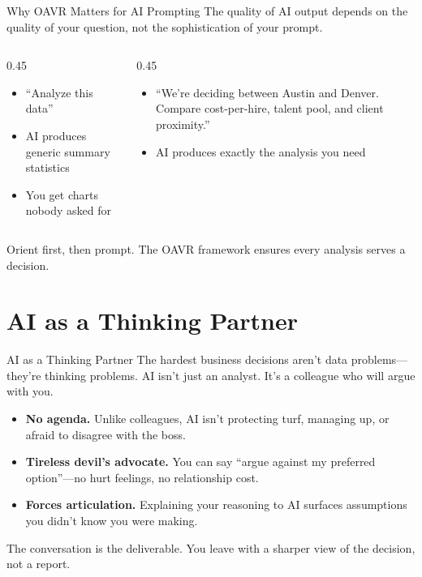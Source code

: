 \documentclass[aspectratio=169]{beamer}
\begin{document}
\begin{frame}{Why OAVR Matters for AI Prompting}
The quality of AI output depends on the quality of your \alert{question}, not the sophistication of your prompt.
\vspace{0.3cm}
\begin{columns}[T]
\begin{column}{0.45\textwidth}
\begin{shadedbox}[title=\textbf{Without OAVR}]
\begin{itemize}\small
  \item ``Analyze this data''
  \item AI produces generic summary statistics
  \item You get charts nobody asked for
\end{itemize}
\end{shadedbox}
\end{column}
\begin{column}{0.45\textwidth}
\begin{shadedbox}[title=\textbf{With OAVR}]
\begin{itemize}\small
  \item ``We're deciding between Austin and Denver. Compare cost-per-hire, talent pool, and client proximity.''
  \item AI produces exactly the analysis you need
\end{itemize}
\end{shadedbox}
\end{column}
\end{columns}
\vspace{0.3cm}
\alert{Orient first, then prompt.}  The OAVR framework ensures every analysis serves a decision.
\end{frame}

\section{AI as a Thinking Partner}

\begin{frame}{AI as a Thinking Partner}
The hardest business decisions aren't data problems---they're \alert{thinking} problems.  AI isn't just an analyst.  It's a colleague who will argue with you.
\vspace{0.3cm}
\begin{itemize}
  \item \textbf{No agenda.}  Unlike colleagues, AI isn't protecting turf, managing up, or afraid to disagree with the boss.
  \item \textbf{Tireless devil's advocate.}  You can say ``argue against my preferred option''---no hurt feelings, no relationship cost.
  \item \textbf{Forces articulation.}  Explaining your reasoning to AI surfaces assumptions you didn't know you were making.
\end{itemize}
\vspace{0.3cm}
\alert{The conversation is the deliverable.}  You leave with a sharper view of the decision, not a report.
\end{frame}
\end{document}
